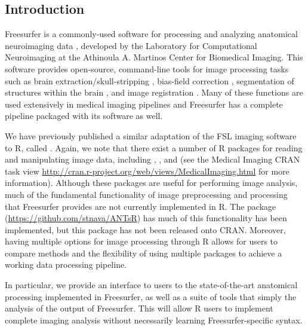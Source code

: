 \subsection{Introduction}\label{introduction}

\label{sec:intro}

Freesurfer is a commonly-used software for processing and analyzing
anatomical neuroimaging data \citep{fischl2012freesurfer}, developed by
the Laboratory for Computational Neuroimaging at the Athinoula A.
Martinos Center for Biomedical Imaging. This software provides
open-source, command-line tools for image processing tasks such as brain
extraction/skull-stripping \citep{segonne2004hybrid}, bias-field
correction \citep{sled_nonparametric_1998}, segmentation of structures
within the brain \citep{fischl2002whole,fischl2004sequence}, and image
registration \citep{fischl1999high,reuter2010highly}. Many of these
functions are used extensively in medical imaging pipelines and
Freesurfer has a complete pipeline packaged with its software as well.

We have previously published a similar adaptation of the FSL imaging
software \citep{jenkinson_fsl_2012} to R, called 
\citep{muschelli2015fslr}. Again, we note that there exist a number of R
packages for reading and manipulating image data, including
 \citep{bordier_temporal_2011}, 
\citep{modat_rniftyreg:_2013}, and 
\citep{tabelow_statistical_2011} (see the Medical Imaging CRAN task view
\url{http://cran.r-project.org/web/views/MedicalImaging.html} for more
information). Although these packages are useful for performing image
analysis, much of the fundamental functionality of image preprocessing
and processing that Freesurfer provides are not currently implemented in
R. The  package (\url{https://github.com/stnava/ANTsR}) has
much of this functionality has been implemented, but this package has
not been released onto CRAN. Moreover, having multiple options for image
processing through R allows for users to compare methods and the
flexibility of using multiple packages to achieve a working data
processing pipeline.

In particular, we provide an interface to users to the state-of-the-art
anatomical processing implemented in Freesurfer, as well as a suite of
tools that simply the analysis of the output of Freesurfer. This will
allow R users to implement complete imaging analysis without necessarily
learning Freesurfer-specific syntax.

